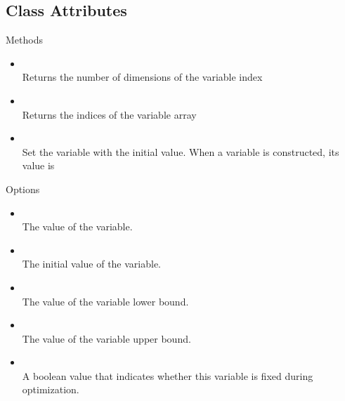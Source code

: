 \subsection{Class Attributes}

Methods
\begin{itemize}

\item {}\\
    Returns the number of dimensions of the variable index

\item {}\\
    Returns the indices of the variable array

\item {}\\
    Set the variable with the initial value.  When a variable is constructed, its value is 

\end{itemize}

Options
\begin{itemize}

\item {}\\
    The value of the variable.

\item {}\\
    The initial value of the variable.

\item {}\\
    The value of the variable lower bound.

\item {}\\
    The value of the variable upper bound.

\item {}\\
    A boolean value that indicates whether this variable is fixed during optimization.

\end{itemize}

